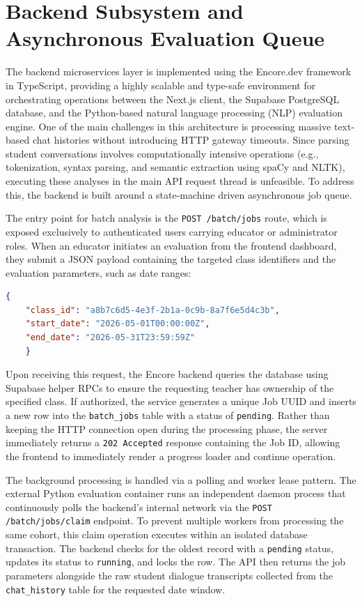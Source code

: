 \documentclass[12pt,a4paper,oneside]{report}
\begin{document}
    \section{Backend Subsystem and Asynchronous Evaluation Queue}
    The backend microservices layer is implemented using the Encore.dev framework in TypeScript, providing a highly scalable and type-safe environment for orchestrating operations between the Next.js client, the Supabase PostgreSQL database, and the Python-based natural language processing (NLP) evaluation engine. One of the main challenges in this architecture is processing massive text-based chat histories without introducing HTTP gateway timeouts. Since parsing student conversations involves computationally intensive operations (e.g., tokenization, syntax parsing, and semantic extraction using spaCy and NLTK), executing these analyses in the main API request thread is unfeasible. To address this, the backend is built around a state-machine driven asynchronous job queue.

    The entry point for batch analysis is the \texttt{POST /batch/jobs} route, which is exposed exclusively to authenticated users carrying educator or administrator roles. When an educator initiates an evaluation from the frontend dashboard, they submit a JSON payload containing the targeted class identifiers and the evaluation parameters, such as date ranges:
    \begin{lstlisting}[language=json,caption={Payload structure for POST /batch/jobs}]
    {
    "class_id": "a8b7c6d5-4e3f-2b1a-0c9b-8a7f6e5d4c3b",
    "start_date": "2026-05-01T00:00:00Z",
    "end_date": "2026-05-31T23:59:59Z"
    }
    \end{lstlisting}
    Upon receiving this request, the Encore backend queries the database using Supabase helper RPCs to ensure the requesting teacher has ownership of the specified class. If authorized, the service generates a unique Job UUID and inserts a new row into the \texttt{batch\_jobs} table with a status of \texttt{pending}. Rather than keeping the HTTP connection open during the processing phase, the server immediately returns a \texttt{202 Accepted} response containing the Job ID, allowing the frontend to immediately render a progress loader and continue operation.

    The background processing is handled via a polling and worker lease pattern. The external Python evaluation container runs an independent daemon process that continuously polls the backend's internal network via the \texttt{POST /batch/jobs/claim} endpoint. To prevent multiple workers from processing the same cohort, this claim operation executes within an isolated database transaction. The backend checks for the oldest record with a \texttt{pending} status, updates its status to \texttt{running}, and locks the row. The API then returns the job parameters alongside the raw student dialogue transcripts collected from the \texttt{chat\_history} table for the requested date window.
\end{document}
